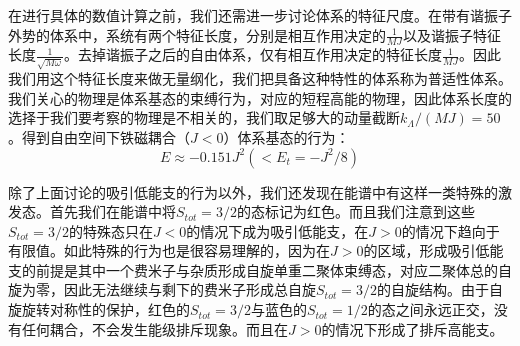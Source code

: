 在进行具体的数值计算之前，我们还需进一步讨论体系的特征尺度。在带有谐振子外势的体系中，系统有两个特征长度，分别是相互作用决定的$\frac{1}{MJ}$以及谐振子特征长度$\frac{1}{\sqrt{M\omega}}$。去掉谐振子之后的自由体系，仅有相互作用决定的特征长度$\frac{1}{MJ}$。因此我们用这个特征长度来做无量纲化，我们把具备这种特性的体系称为普适性体系。我们关心的物理是体系基态的束缚行为，对应的短程高能的物理，因此体系长度的选择于我们要考察的物理是不相关的，我们取足够大的动量截断$k_{\Lambda}/(MJ)=50$。得到自由空间下铁磁耦合（$J<0$）体系基态的行为：
\begin{equation}
E \approx-0.151 J^{2}\left(<E_{t}=-J^{2} / 8\right)
\end{equation}

除了上面讨论的吸引低能支的行为以外，我们还发现在能谱中有这样一类特殊的激发态。首先我们在能谱中将$S_{tot}=3/2$的态标记为红色。而且我们注意到这些$S_{tot}=3/2$的特殊态只在$J<0$的情况下成为吸引低能支，在$J>0$的情况下趋向于有限值。如此特殊的行为也是很容易理解的，因为在$J>0$的区域，形成吸引低能支的前提是其中一个费米子与杂质形成自旋单重二聚体束缚态，对应二聚体总的自旋为零，因此无法继续与剩下的费米子形成总自旋$S_{tot}=3/2$的自旋结构。由于自旋旋转对称性的保护，红色的$S_{tot}=3/2$与蓝色的$S_{tot}=1/2$的态之间永远正交，没有任何耦合，不会发生能级排斥现象。而且在$J>0$的情况下形成了排斥高能支。

